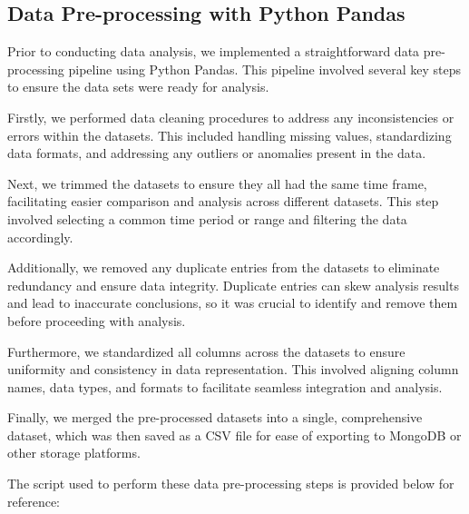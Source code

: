 \documentclass[runningheads]{llncs}
\begin{document}
\subsection{Data Pre-processing with Python Pandas}

Prior to conducting data analysis, we implemented a straightforward data pre-processing pipeline using Python Pandas. This pipeline involved several key steps to ensure the data sets were ready for analysis.

Firstly, we performed data cleaning procedures to address any inconsistencies or errors within the datasets. This included handling missing values, standardizing data formats, and addressing any outliers or anomalies present in the data.

Next, we trimmed the datasets to ensure they all had the same time frame, facilitating easier comparison and analysis across different datasets. This step involved selecting a common time period or range and filtering the data accordingly.

Additionally, we removed any duplicate entries from the datasets to eliminate redundancy and ensure data integrity. Duplicate entries can skew analysis results and lead to inaccurate conclusions, so it was crucial to identify and remove them before proceeding with analysis.

Furthermore, we standardized all columns across the datasets to ensure uniformity and consistency in data representation. This involved aligning column names, data types, and formats to facilitate seamless integration and analysis.

Finally, we merged the pre-processed datasets into a single, comprehensive dataset, which was then saved as a CSV file for ease of exporting to MongoDB or other storage platforms.

The script used to perform these data pre-processing steps is provided below for reference:
\end{document}
